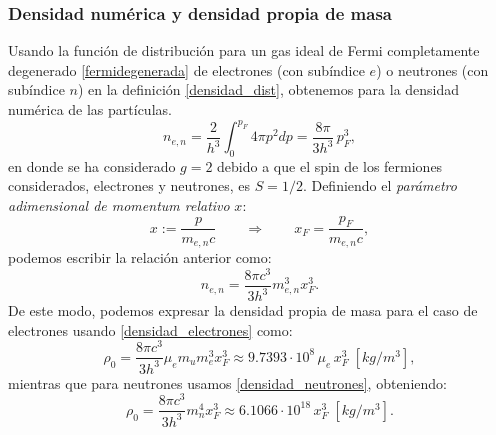 \subsubsection{Densidad numérica y densidad propia de masa}
Usando la función de distribución para un gas ideal de Fermi completamente degenerado \eqref{fermidegenerada} de electrones (con subíndice $e$) o neutrones (con subíndice $n$)  en la definición \eqref{densidad_dist}, obtenemos para la densidad numérica de las partículas.
\begin{equation}
 n_{e,n}=\frac{2}{h^3}\int_0^{p_F}4\pi p^2 dp=\frac{8\pi}{3h^3}\,p_F^3,
\end{equation}
en donde se ha considerado $g=2$ debido a que el spin de los fermiones considerados, electrones y neutrones, es $S=1/2$. Definiendo el \textit{parámetro adimensional de momentum relativo} $x$:
\begin{equation}\label{xrelativo}
 x:=\frac{p}{m_{e,n}c}\qquad\Rightarrow\qquad x_F=\frac{p_F}{m_{e,n} c},
\end{equation}
podemos escribir la relación anterior como:
\begin{equation}\label{densidadfermi1}
 n_{e,n}=\frac{8\pi c^3}{3 h^3}m_{e,n}^3x_F^3.
\end{equation}
De este modo, podemos expresar la densidad propia de masa para el caso de electrones usando \eqref{densidad_electrones} como:
\begin{equation}\label{densidad_electrones-fermi}
\boxed{ \rho_0= \frac{8\pi c^3}{3 h^3}\mu_em_u m_e^3x_F^3\approx9.7393\cdot10^8\,\mu_e\, x_F^3\;[kg/m^3],}
\end{equation}
mientras que para neutrones usamos \eqref{densidad_neutrones}, obteniendo:
\begin{equation}\label{densidad_neutrones-fermi}
\boxed{ \rho_0= \frac{8\pi c^3}{3 h^3} m_n^4x_F^3\approx6.1066\cdot10^{18}\,x_F^3\;[kg/m^3].}
\end{equation}

